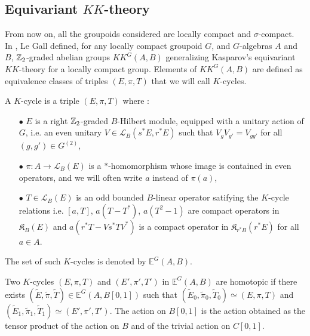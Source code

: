 \subsection{Equivariant $KK$-theory}

From now on, all the groupoids considered are locally compact and $\sigma$-compact.\\

In \cite{LeGall}, Le Gall defined, for any locally compact groupoid $G$, and $G$-algebras $A$ and $B$, $\mathbb Z_2$-graded abelian groups $KK^G(A,B)$ generalizing Kasparov's equivariant $KK$-theory for a locally compact group. Elements of $KK^G(A,B)$ are defined as equivalence classes of triples $(E,\pi,T)$ that we will call $K$-cycles.

\begin{definition} A $K$-cycle is a triple $(E,\pi,T)$ where :
\begin{itemize}
\item[$\bullet$] $E$ is a right $\mathbb Z_2$-graded $B$-Hilbert module, equipped with a unitary action of $G$, i.e. an even unitary $V\in\mathcal L_B(s^*E,r^*E)$ such that $V_g V_{g'} = V_{gg'}$ for all $(g,g')\in G^{(2)}$,
\item[$\bullet$] $\pi : A\rightarrow \mathcal L_B(E)$ is a $*$-homomorphism whose image is contained in even operators, and we will often write $a$ instead of $\pi(a)$,
\item[$\bullet$] $T\in\mathcal L_B(E)$ is an odd bounded $B$-linear operator satifying the $K$-cycle relations i.e. $[a, T]$, $a(T-T^*)$, $a(T^2-1)$ are compact operators in $\mathfrak K_B(E)$ and $a(r^* T -V s^*T V^*)$ is a compact operator in $\mathfrak K_{r^* B}(r^* E)$ for all $a\in A$.
\end{itemize} 
The set of such $K$-cycles is denoted by $\mathbb E^G(A,B)$.
\end{definition}

\begin{definition}
Two $K$-cycles $(E,\pi,T)$ and $ (E',\pi',T')$ in $\mathbb E^G(A,B)$ are homotopic if there exists $ (\tilde E,\tilde \pi,\tilde T) \in\mathbb E^G(A,B[0,1])$ such that $(\tilde E_0,\tilde \pi_0,\tilde T_0)\simeq (E,\pi,T)$ and $(\tilde E_1,\tilde \pi_1,\tilde T_1)\simeq (E',\pi',T')$. The action on $B[0,1]$ is the action obtained as the tensor product of the action on $B$ and of the trivial action on $C[0,1]$.
\end{definition}

